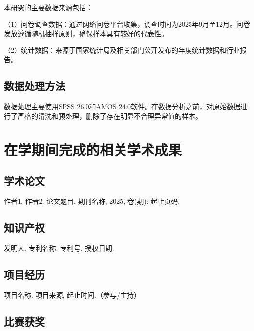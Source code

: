 \documentclass[numbering=arabic,fontset=auto]{jnuthesis}
\begin{document}
本研究的主要数据来源包括：

（1）问卷调查数据：通过网络问卷平台收集，调查时间为2025年9月至12月。问卷发放遵循随机抽样原则，确保样本具有较好的代表性。

（2）统计数据：来源于国家统计局及相关部门公开发布的年度统计数据和行业报告。

\section{数据处理方法}

数据处理主要使用SPSS 26.0和AMOS 24.0软件。在数据分析之前，对原始数据进行了严格的清洗和预处理，删除了存在明显不合理异常值的样本。

\chapter{在学期间完成的相关学术成果}

\section{学术论文}

\begin{enumerate}[label={[\arabic*]}]
  \item 作者1, 作者2. 论文题目. 期刊名称, 2025, 卷(期): 起止页码.
\end{enumerate}

\section{知识产权}

\begin{enumerate}[label={[\arabic*]}]
  \item 发明人. 专利名称. 专利号, 授权日期.
\end{enumerate}

\section{项目经历}

\begin{enumerate}[label={[\arabic*]}]
  \item 项目名称. 项目来源, 起止时间.（参与/主持）
\end{enumerate}

\section{比赛获奖}
\end{document}

